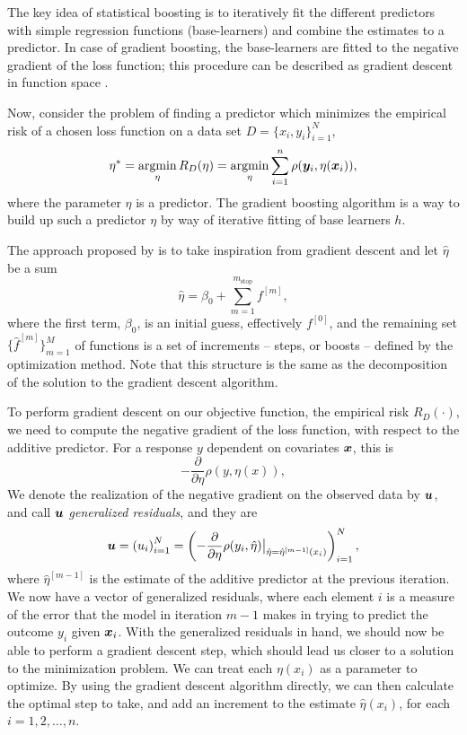 The key idea of statistical boosting is to iteratively fit the different predictors with simple regression functions (base-learners) and combine the estimates to a predictor. In case of gradient boosting, the base-learners are fitted to the negative gradient of the loss function; this procedure can be described as gradient descent in function space \citep{buhlmann2007}.

Now, consider the problem of finding a predictor which minimizes the empirical risk of a chosen loss function on a data set
$D=\{x_i,y_i\}_{i=1}^N$,
\begin{equation}\label{eq:argmin-eta}
    \eta^*=\operatorname*{argmin}_{\eta}R_D(\eta)=\operatorname*{argmin}_{\eta}\sum_{i=1}^n\rho(\bm{y}_i,\eta(\bm{x}_i)),
\end{equation}
where the parameter $\eta$ is a predictor.
The gradient boosting algorithm is a way to build up such a predictor $\eta$ by way of iterative fitting of base learners $h$.

The approach proposed by \citet{friedman2001} is to take inspiration from gradient descent and let $\hat{\eta}$ be a sum
\begin{equation}
    \hat{\eta}=\beta_0+\sum_{m=1}^{m_{\text{stop}}}f^{[m]},
\end{equation}
where the first term, $\beta_0$, is an initial guess, effectively $f^{[0]}$, and the remaining set $\{\hat{f}^{[m]}\}_{m=1}^M$ of 
functions is a set of increments -- steps, or boosts -- defined by the optimization method. Note that this structure
is the same as the decomposition of the solution to the gradient descent algorithm.

To perform gradient descent on our objective function, the empirical risk $R_D(\cdot)$,
we need to compute the negative gradient of the loss function, with respect to the additive predictor. For a response $y$ dependent on
covariates $\bm{x}$, this is
\begin{equation}
    -\frac{\partial}{\partial\eta} \rho(y,\eta(x)),
\end{equation}
We denote the realization of the negative gradient on the observed data by $\bm{u}$, and call $\bm{u}$ \textit{generalized residuals}, and they are
\begin{equation}
    \bm{u}=\left(u_i\right)_{i=1}^N=\left(-\frac{\partial}{\partial \eta}\rho(y_i, \hat{\eta})\big\rvert_{\hat{\eta}=\hat{\eta}^{[m-1]}(x_i)}\right)_{i=1}^N,
\end{equation}
where $\hat{\eta}^{[m-1]}$ is the estimate of the additive predictor at the previous iteration.
We now have a vector of generalized residuals, where each element $i$ is a measure of the error that the model in iteration $m-1$ makes
in trying to predict the outcome $y_i$ given $\bm{x}_i$.
With the generalized residuals in hand, we should now be able to perform a gradient descent step, which should lead us closer to a solution
to the minimization problem. We can treat each $\eta(x_i)$ as a parameter to optimize. By using the gradient descent algorithm directly, we
can then calculate the optimal step to take, and add an increment to the estimate $\hat{\eta}(x_i)$, for each $i=1,2,\ldots,n$.

